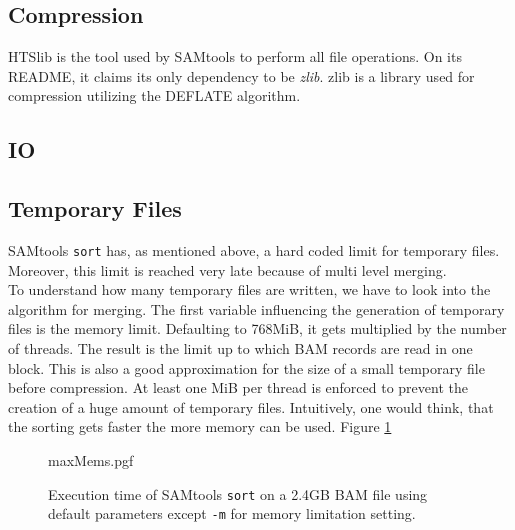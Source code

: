 \subsection{Compression}
HTSlib is the tool used by SAMtools to perform all file operations. On its README, it claims its only dependency to be \textit{zlib}. zlib is a library used for compression utilizing the DEFLATE algorithm. 

\subsection{IO}


\subsection{Temporary Files}
SAMtools \texttt{sort} has, as mentioned above, a hard coded limit for temporary files. Moreover, this limit is reached very late because of multi level merging. \\
To understand how many temporary files are written, we have to look into the algorithm for merging. The first variable influencing the generation of temporary files is the memory limit. Defaulting to 768MiB, it gets multiplied by the number of threads. The result is the limit up to which BAM records are read in one block. This is also a good approximation for the size of a small temporary file before compression. At least one MiB per thread is enforced to prevent the creation of a huge amount of temporary files. Intuitively, one would think, that the sorting gets faster the more memory can be used. Figure \ref{fig:maxMems}
\begin{figure}
        {maxMems.pgf}
    \caption{Execution time of SAMtools \texttt{sort} on a 2.4GB BAM file using default parameters except \texttt{-m} for memory limitation setting. }
    \label{fig:maxMems}
\end{figure}